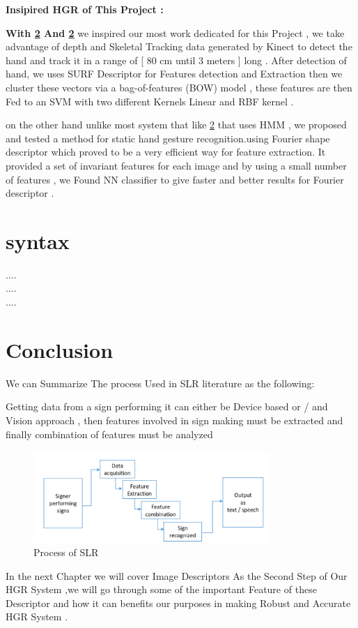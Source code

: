 \textbf{ Insipired HGR of This Project : }


\textbf{With \ref{} And \ref{} } we inspired our most work dedicated for this Project , we take advantage of  depth and Skeletal Tracking  data generated by Kinect to detect the hand and track it  in a range of [ 80 cm until 3 meters ] long  .
After detection of hand, we uses SURF Descriptor for Features detection and Extraction then we  cluster these vectors via a bag-of-features (BOW) model , these features are then Fed to an SVM with two different Kernels Linear and RBF kernel .

on the other hand unlike most system that like \ref{} that uses HMM ,  we proposed and tested a method for static hand gesture recognition.using  Fourier shape  descriptor which proved to be a very efficient way for feature extraction. It provided a set of invariant features for each image and by using a small number of features , we Found NN classifier to give faster and better results for Fourier descriptor .


\section{syntax}

....
\\
....
\\
....


\newpage
\section{Conclusion}

We can Summarize The process Used in SLR literature as the following:

Getting data from a sign performing  it can either be Device based or / and Vision approach , then features
involved in sign making must be extracted and finally combination of features must be analyzed 

\begin{figure}[H]
\centering
\includegraphics[width=0.8\textwidth]{img/SLR.PNG}
\caption{  Process of SLR }
\label{fig:SLR}
\end{figure}

In the next Chapter we will cover Image Descriptors As the Second Step of Our HGR System ,we will go through some of the important Feature of these Descriptor and how it can benefits our purposes in making Robust and Accurate HGR System . 